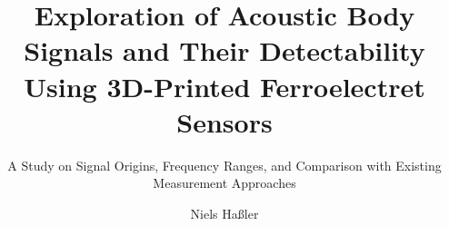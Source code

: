 \documentclass[
	ngerman,
	ruledheaders=section,%
	class=report,%
	thesis={type=report},%
	accentcolor=1c,%
	custommargins=false,%
	marginpar=false,%
	BCOR=5mm,%
	parskip=half-,%
	fontsize=11pt,%
]{tudapub}
\begin{document}

\title{Exploration of Acoustic Body
Signals and Their Detectability
Using 3D-Printed Ferroelectret
Sensors
}
\subtitle{A Study on Signal Origins, Frequency Ranges, and Comparison with Existing Measurement
Approaches}
\author[N. Haßler]{Niels Haßler}%


\submissiondate{\today}
\examdate{\today}



\maketitle

\tableofcontents
\end{document}
